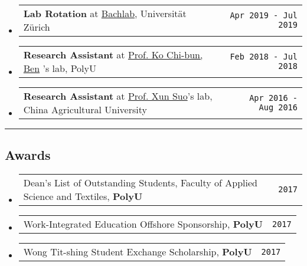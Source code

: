 \documentclass[10pt,a4paper]{article}
\makeatletter
\newcommand{\headerrow}[2]
{\begin{tabular*}{\linewidth}{l@{\extracolsep{\fill}}r}
	#1 &
	#2 \\
\end{tabular*}}
\newcommand{\urlKo}{https://www.polyu.edu.hk/en/abct/people/academic-staff/dr-ko-cb-ben/}
\newcommand{\urlSuo}{https://cvm.cau.edu.cn/art/2017/9/8/art_41955_48.html}
\newcommand{\Bachlab}{\href{http://bachlab.org/}{Bachlab}}
\newcommand{\CongiBench}{\href{https://github.com/fmelinscak/cognibench}{CongiBench}}
\newcommand{\SciUnit}{\href{https://github.com/scidash/sciunit}{SciUnit}}
\makeatother
\begin{document}
\begin{itemize}
	\item
	      \headerrow
	      {\textbf{Lab Rotation} at \Bachlab, Universität Zürich}
	      {\texttt{Apr 2019 - Jul 2019}}

	\item
	      \headerrow
	      {\textbf{Research Assistant} at \href{\urlKo}{Prof. Ko Chi-bun, Ben}
		      's lab, PolyU}
	      {\texttt{Feb 2018 - Jul 2018}}

	\item
	      \headerrow
	      {\textbf{Research Assistant} at \href{\urlSuo}{Prof. Xun Suo}'s lab,
		      China Agricultural University}
	      {\texttt{Apr 2016 - Aug 2016}}

\end{itemize}



\hrule
\vspace{-1em}
\subsection*{Awards}

\begin{itemize}
	\parskip=0.1em
	\item
	      \headerrow
	      {Dean’s List of Outstanding Students, Faculty of Applied Science and
		      Textiles, \textbf{PolyU}}
	      {\texttt{{2017}}}

	\item
	      \headerrow
	      {Work-Integrated Education Offshore Sponsorship, \textbf{PolyU}}
	      {\texttt{{2017}}}

	\item
	      \headerrow
	      {Wong Tit-shing Student Exchange Scholarship, \textbf{PolyU}}
	      {\texttt{{2017}}}

\end{itemize}
\end{document}
